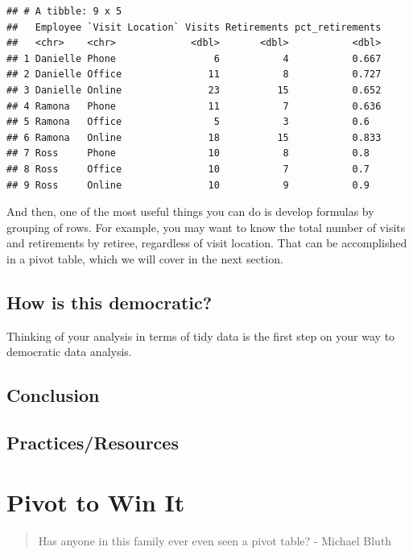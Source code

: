 \documentclass[]{book}
\begin{document}
\begin{verbatim}
## # A tibble: 9 x 5
##   Employee `Visit Location` Visits Retirements pct_retirements
##   <chr>    <chr>             <dbl>       <dbl>           <dbl>
## 1 Danielle Phone                 6           4           0.667
## 2 Danielle Office               11           8           0.727
## 3 Danielle Online               23          15           0.652
## 4 Ramona   Phone                11           7           0.636
## 5 Ramona   Office                5           3           0.6  
## 6 Ramona   Online               18          15           0.833
## 7 Ross     Phone                10           8           0.8  
## 8 Ross     Office               10           7           0.7  
## 9 Ross     Online               10           9           0.9
\end{verbatim}

And then, one of the most useful things you can do is develop formulas by grouping of rows. For example, you may want to know the total number of visits and retirements by retiree, regardless of visit location. That can be accomplished in a pivot table, which we will cover in the next section.

\hypertarget{how-is-this-democratic}{%
\section{How is this democratic?}\label{how-is-this-democratic}}

Thinking of your analysis in terms of tidy data is the first step on your way to democratic data analysis.

\hypertarget{conclusion}{%
\section{Conclusion}\label{conclusion}}

\hypertarget{practicesresources}{%
\section{Practices/Resources}\label{practicesresources}}

\hypertarget{pivot-to-win-it}{%
\chapter{Pivot to Win It}\label{pivot-to-win-it}}

\begin{quote}
Has anyone in this family ever even seen a pivot table? - Michael Bluth
\end{quote}
\end{document}
